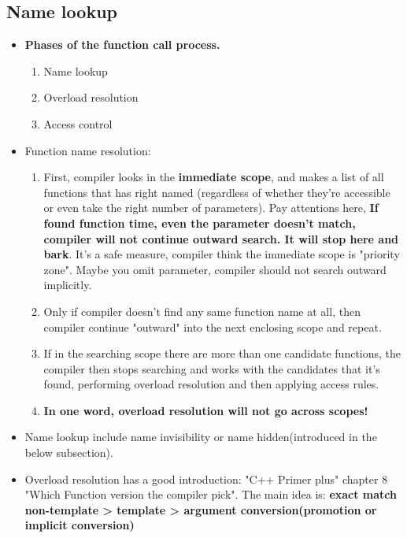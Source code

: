 \documentclass[a4paper,12pt,twoside]{book}
\begin{document}
\subsection{Name lookup}
\begin{itemize}

\item \textbf{Phases of the function call process.}
\begin{enumerate}
\item Name lookup 
\item Overload resolution 
\item Access control
\end{enumerate}

\item Function name resolution:
\begin{enumerate}
	\item First, compiler looks in the \textbf{immediate scope},  and makes a list of all functions that has right named  (regardless of whether they're accessible or even take the right number of parameters). Pay attentions here, \textbf{If found function time, even the parameter doesn't match, compiler will not continue outward search. It will stop here and bark}. It's a safe measure, compiler think the immediate scope is "priority zone". Maybe you omit parameter, compiler should not search outward implicitly. 
	
	\item Only if compiler doesn't find any same function name at all, then compiler continue "outward" into the next enclosing scope and repeat.
	
	\item If in the searching scope there are more than one candidate functions, the compiler then stops searching and works with the candidates that it's found, performing overload resolution and then applying access rules.
	
	\item \textbf{In one word, overload resolution will not go across scopes!}
\end{enumerate}

\item Name lookup include name invisibility or name hidden(introduced in the below subsection).

\item Overload resolution has a good introduction: "C++ Primer plus" chapter 8 "Which Function version the compiler pick". The main idea is: \textbf{exact match non-template > template > argument conversion(promotion or implicit conversion)}

\end{itemize}
\end{document}
